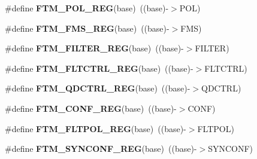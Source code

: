 \begin{DoxyCompactItemize}
\item 
\#define {\bfseries F\+T\+M\+\_\+\+P\+O\+L\+\_\+\+R\+EG}(base)~((base)-\/$>$P\+OL)\hypertarget{group__FTM__Register__Accessor__Macros_ga9525ab8f8066931fe511722b30888360}{}\label{group__FTM__Register__Accessor__Macros_ga9525ab8f8066931fe511722b30888360}

\item 
\#define {\bfseries F\+T\+M\+\_\+\+F\+M\+S\+\_\+\+R\+EG}(base)~((base)-\/$>$F\+MS)\hypertarget{group__FTM__Register__Accessor__Macros_ga0e52ee8f1d5e149a11c2a41364549bac}{}\label{group__FTM__Register__Accessor__Macros_ga0e52ee8f1d5e149a11c2a41364549bac}

\item 
\#define {\bfseries F\+T\+M\+\_\+\+F\+I\+L\+T\+E\+R\+\_\+\+R\+EG}(base)~((base)-\/$>$F\+I\+L\+T\+ER)\hypertarget{group__FTM__Register__Accessor__Macros_gaf294cd79d00eb02b73a45209922993b7}{}\label{group__FTM__Register__Accessor__Macros_gaf294cd79d00eb02b73a45209922993b7}

\item 
\#define {\bfseries F\+T\+M\+\_\+\+F\+L\+T\+C\+T\+R\+L\+\_\+\+R\+EG}(base)~((base)-\/$>$F\+L\+T\+C\+T\+RL)\hypertarget{group__FTM__Register__Accessor__Macros_ga3526b92dd4ace3ec076ac37ae5f2957f}{}\label{group__FTM__Register__Accessor__Macros_ga3526b92dd4ace3ec076ac37ae5f2957f}

\item 
\#define {\bfseries F\+T\+M\+\_\+\+Q\+D\+C\+T\+R\+L\+\_\+\+R\+EG}(base)~((base)-\/$>$Q\+D\+C\+T\+RL)\hypertarget{group__FTM__Register__Accessor__Macros_gabdac200971bb9e418f543b7a11c02fb5}{}\label{group__FTM__Register__Accessor__Macros_gabdac200971bb9e418f543b7a11c02fb5}

\item 
\#define {\bfseries F\+T\+M\+\_\+\+C\+O\+N\+F\+\_\+\+R\+EG}(base)~((base)-\/$>$C\+O\+NF)\hypertarget{group__FTM__Register__Accessor__Macros_gaa5a44ecf250b480be7446d8beed3cba1}{}\label{group__FTM__Register__Accessor__Macros_gaa5a44ecf250b480be7446d8beed3cba1}

\item 
\#define {\bfseries F\+T\+M\+\_\+\+F\+L\+T\+P\+O\+L\+\_\+\+R\+EG}(base)~((base)-\/$>$F\+L\+T\+P\+OL)\hypertarget{group__FTM__Register__Accessor__Macros_ga421b09e9029d887b487c4265469e4315}{}\label{group__FTM__Register__Accessor__Macros_ga421b09e9029d887b487c4265469e4315}

\item 
\#define {\bfseries F\+T\+M\+\_\+\+S\+Y\+N\+C\+O\+N\+F\+\_\+\+R\+EG}(base)~((base)-\/$>$S\+Y\+N\+C\+O\+NF)\hypertarget{group__FTM__Register__Accessor__Macros_gaf9fc200be2ca4557c5823f38b4f762ff}{}\label{group__FTM__Register__Accessor__Macros_gaf9fc200be2ca4557c5823f38b4f762ff}


\end{DoxyCompactItemize}
